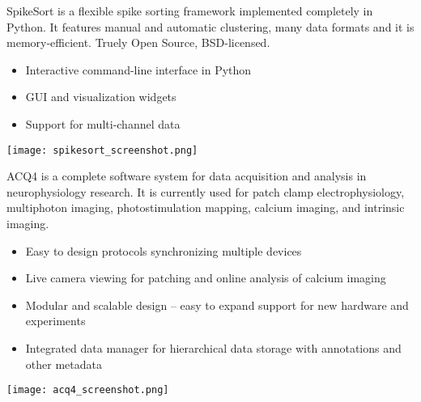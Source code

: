 \begin{multicols}{3}
SpikeSort is a flexible spike sorting framework implemented completely
in Python. It features manual and automatic clustering, many data
formats and it is memory-efficient. Truely Open Source, BSD-licensed.

\begin{itemize}[nolistsep,topsep=0em,leftmargin=1pc]
\item Interactive command-line interface in Python
\item GUI and visualization widgets
\item Support for multi-channel data
\end{itemize}

\vspace{1em}
\texttt{[image: spikesort\_screenshot.png]}


\columnbreak


%



ACQ4 is a complete software system for data acquisition and analysis in neurophysiology research. It is currently used for patch clamp electrophysiology, multiphoton imaging, photostimulation mapping, calcium imaging, and intrinsic imaging.

\begin{itemize}[nolistsep,topsep=0em,leftmargin=1pc]
\item Easy to design protocols synchronizing multiple devices
\item Live camera viewing for patching and online analysis of calcium imaging
\item Modular and scalable design -- easy to expand support for new hardware and experiments
\item Integrated data manager for hierarchical data storage with annotations and other metadata
\end{itemize}

\vspace{1em}
\texttt{[image: acq4\_screenshot.png]}



\end{multicols}


